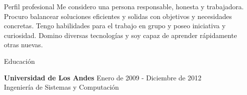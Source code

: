 \documentclass{resume} %
\def\uniandes{Universidad de Los Andes }
\begin{document}
\begin{rSection}{Perfil profesional}
Me considero una persona responsable, honesta y trabajadora. Procuro balancear soluciones eficientes y solidas con objetivos y necesidades concretas. Tengo habilidades para el trabajo en grupo y poseo iniciativa y curiosidad. Domino diversas tecnolog\'ias y soy capaz de aprender r\'apidamente otras nuevas.

\end{rSection}

\begin{rSection}{Educaci\'on}

{\bf \uniandes} \hfill Enero de 2009 - Diciembre de 2012 \\ 
Ingenier\'ia de Sistemas y Computaci\'on \\

\end{rSection}

\end{document}
